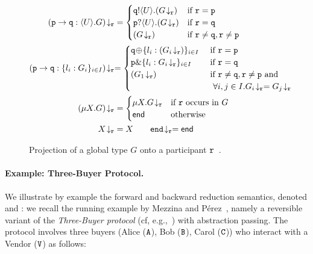 \documentclass[runningheads,plain]{llncs}
\begin{document}
\begin{figure}[!t]
{
\begin{align*}
\tproj{(\gtcom{p}{q}{U}{G})}{\gpart{r}} & = 
\begin{cases}
\ltout{q}{U}{(\tproj{G}{\gpart{r}})} & \text{if $\gpart{r} = \gpart{p}$} \\
\ltinp{p}{U}{(\tproj{G}{\gpart{r}})} & \text{if $\gpart{r} = \gpart{q}$} \\
(\tproj{G}{\gpart{r}}) &  \text{if $\gpart{r} \neq \gpart{q}, \gpart{r} \neq \gpart{p}$}
\end{cases}
\\
\tproj{(\gtcho{p}{q}{l_i}{G_i})}{\gpart{r}}  
& 
{= 
\begin{cases}
\ltsel{q}{\lbl_i}{(\tproj{G_i}{\gpart{r}})}{i}{I}  & \text{ if $\gpart{r} = \gpart{p}$} \\
\ltbra{p}{\lbl_i}{\tproj{G_i}{\gpart{r}}}{i}{I}  & \text{ if $\gpart{r} = \gpart{q}$} \\
(\tproj{{G_1}}{\gpart{r}}) &  \text{ if $\gpart{r} \neq \gpart{q}, \gpart{r} \neq \gpart{p}$ and} \\ 
& \text{~~$\forall i, j \in I. \tproj{{G_i}}{\gpart{r}} = \tproj{{G_j}}{\gpart{r}}$}
\end{cases}
}
\\
\tproj{(\mu X. G)}{\gpart{r}} &= 
\begin{cases}
\mu X. \tproj{G}{\gpart{r}} & \text{if $\gpart{r}$ occurs in $G$}
\\
\lend & \text{otherwise}
\end{cases}
\\
\tproj{X}{\gpart{r}} & = X
\qquad
\tproj{\gend}{\gpart{r}} = \lend
\end{align*}
}
\vspace{-6mm}
\caption{Projection of a global type $G$ onto a participant $\mathtt{r}$~\cite{DBLP:conf/ppdp/MezzinaP17}.\label{f:proj}}
\vspace{-5mm}
\end{figure}

\paragraph{Example: Three-Buyer Protocol.}
We illustrate by example the 
forward and backward reduction semantics, denoted \fw and \bk: we recall the running example by Mezzina and P\'{e}rez~\cite{DBLP:conf/ppdp/MezzinaP17}, namely
  a reversible variant of the \emph{Three-Buyer protocol}  (cf, e.g.,~\cite{CDYP2015})
with abstraction passing. 
The protocol 
involves three buyers (Alice ($\mathtt{A}$), Bob ($\mathtt{B}$), Carol ($\mathtt{C}$)) who interact with a Vendor ($\mathtt{V}$) as follows:
\end{document}
